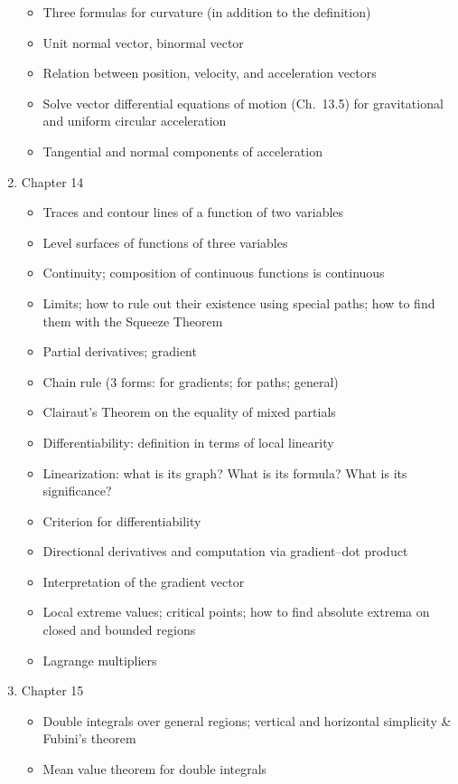 \documentclass[12pt]{amsart}
\begin{document}
\begin{enumerate}
\begin{itemize}
    \item Three formulas for curvature (in addition to the definition)
    \item Unit normal vector, binormal vector
    \item Relation between position, velocity, and acceleration vectors
    \item Solve vector differential equations of motion (Ch.\ 13.5) for gravitational and uniform circular acceleration
    \item Tangential and normal components of acceleration
\end{itemize}
\item Chapter 14
\begin{itemize}
    \item Traces and contour lines of a function of two variables
    \item Level surfaces of functions of three variables
    \item Continuity; composition of continuous functions is continuous
    \item Limits; how to rule out their existence using special paths; how to find them with the Squeeze Theorem
    \item Partial derivatives; gradient
    \item Chain rule (3 forms: for gradients; for paths; general)
    \item Clairaut's Theorem on the equality of mixed partials
    \item Differentiability: definition in terms of local linearity
    \item Linearization: what is its graph? What is its formula? What is its significance?
    \item Criterion for differentiability
    \item Directional derivatives and computation via gradient--dot product
    \item Interpretation of the gradient vector
    \item Local extreme values; critical points; how to find absolute extrema on closed and bounded regions
    \item Lagrange multipliers
\end{itemize}
\item Chapter 15
\begin{itemize}
    \item Double integrals over general regions; vertical and horizontal simplicity \& Fubini's theorem
    \item Mean value theorem for double integrals

\end{itemize}
\end{enumerate}
\end{document}
